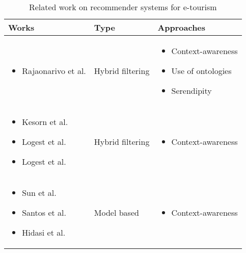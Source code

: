 \begin{table}[h!]
    \centering
    \begin{tabular}{ |m{3cm}|m{1cm}|m{2.7cm}| } 
        \hline
        Works & Type & Approaches \\
        \hline
        \hline

        \begin{itemize}
            \item Rajaonarivo et al. \cite{rajaonarivo2019rec}
        \end{itemize} &
        
            Hybrid filtering &

            \begin{itemize}
                \item Context-awareness
                \item Use of ontologies
                \item Serendipity
            \end{itemize}
        
        \\ \hline

        \begin{itemize}
            \item Kesorn et al. \cite{kesorn2017personalized}
            \item Logest et al. \cite{logesh2019exploring}
            \item Logest et al. \cite{logesh2018personalised}
        \end{itemize} &

            Hybrid filtering &

            \begin{itemize}
                \item Context-awareness
            \end{itemize}

        \\ \hline

        \begin{itemize}
            \item Sun et al. \cite{sun2019building}
            \item Santos et al. \cite{santos2019using}
            \item Hidasi et al. \cite{hidasi2016general}
        \end{itemize} &
            
            Model based &
        
            \begin{itemize}
                \item Context-awareness
            \end{itemize}

        \\

        \hline
    \end{tabular}
    \caption{Related work on recommender systems for e-tourism}
    \label{table:related-work}
    \end{table}

